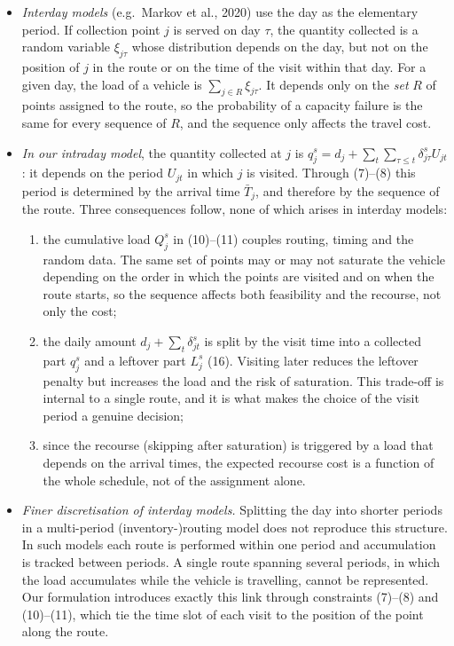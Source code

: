 \documentclass[11pt,a4paper]{article}
\begin{document}
\begin{itemize}[leftmargin=*]
\item \emph{Interday models} (e.g.\ Markov et al., 2020) use the day as the elementary period. If collection point $j$ is served on day $\tau$, the quantity collected is a random variable $\xi_{j\tau}$ whose distribution depends on the day, but not on the position of $j$ in the route or on the time of the visit within that day. For a given day, the load of a vehicle is $\sum_{j\in R}\xi_{j\tau}$. It depends only on the \emph{set} $R$ of points assigned to the route, so the probability of a capacity failure is the same for every sequence of $R$, and the sequence only affects the travel cost.
\item \emph{In our intraday model}, the quantity collected at $j$ is $q^s_j=d_j+\sum_{t}\sum_{\tau\le t}\delta^s_{j\tau}U_{jt}$: it depends on the period $U_{jt}$ in which $j$ is visited. Through (7)--(8) this period is determined by the arrival time $\bar T_j$, and therefore by the sequence of the route. Three consequences follow, none of which arises in interday models:
 \begin{enumerate}
 \item the cumulative load $Q^s_j$ in (10)--(11) couples routing, timing and the random data. The same set of points may or may not saturate the vehicle depending on the order in which the points are visited and on when the route starts, so the sequence affects both feasibility and the recourse, not only the cost;
 \item the daily amount $d_j+\sum_{t}\delta^s_{jt}$ is split by the visit time into a collected part $q^s_j$ and a leftover part $L^s_j$ (16). Visiting later reduces the leftover penalty but increases the load and the risk of saturation. This trade-off is internal to a single route, and it is what makes the choice of the visit period a genuine decision;
 \item since the recourse (skipping after saturation) is triggered by a load that depends on the arrival times, the expected recourse cost is a function of the whole schedule, not of the assignment alone.
 \end{enumerate}
\item \emph{Finer discretisation of interday models.} Splitting the day into shorter periods in a multi-period (inventory-)routing model does not reproduce this structure. In such models each route is performed within one period and accumulation is tracked between periods. A single route spanning several periods, in which the load accumulates while the vehicle is travelling, cannot be represented. Our formulation introduces exactly this link through constraints (7)--(8) and (10)--(11), which tie the time slot of each visit to the position of the point along the route.
\end{itemize}
\end{document}
